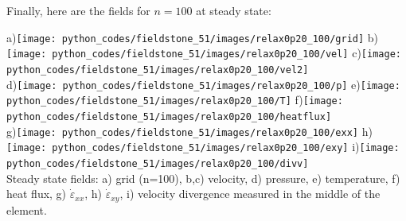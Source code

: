 Finally, here are the fields for $n=100$ at steady state:

\begin{center}
a)\texttt{[image: python\_codes/fieldstone\_51/images/relax0p20\_100/grid]}
b)\texttt{[image: python\_codes/fieldstone\_51/images/relax0p20\_100/vel]}
c)\texttt{[image: python\_codes/fieldstone\_51/images/relax0p20\_100/vel2]}\\
d)\texttt{[image: python\_codes/fieldstone\_51/images/relax0p20\_100/p]}
e)\texttt{[image: python\_codes/fieldstone\_51/images/relax0p20\_100/T]}
f)\texttt{[image: python\_codes/fieldstone\_51/images/relax0p20\_100/heatflux]}\\
g)\texttt{[image: python\_codes/fieldstone\_51/images/relax0p20\_100/exx]}
h)\texttt{[image: python\_codes/fieldstone\_51/images/relax0p20\_100/exy]}
i)\texttt{[image: python\_codes/fieldstone\_51/images/relax0p20\_100/divv]}\\
{\captionfont Steady state fields: a) grid (n=100), b,c) velocity, d) pressure, e) temperature,
f) heat flux, g) $\dot{\varepsilon}_{xx}$, h) $\dot{\varepsilon}_{xy}$, i) velocity 
divergence measured in the middle of the element.}
\end{center}




